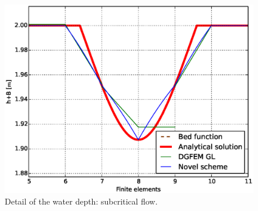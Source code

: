 \begin{figure}[!ht]
\begin{minipage}[t]{0.44\textwidth}
\begin{center}
								    \includegraphics[width=1.0\textwidth]{OBR/bump/subHdet.eps}
								    \caption{Detail of the water depth: subcritical flow.}
								    \label{subHdet}
								    \end{center}
								\end{minipage}
				\end{figure}
